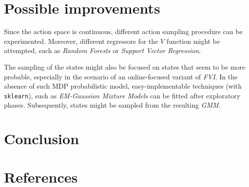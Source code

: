 \documentclass[a4paper, 12pt]{article}
\begin{document}
\section*{Possible improvements}

Since the action space is continuous, different action sampling procedure
can be experimented. Moreover, different regressors for the 
$V$ function might be attempted,
such as \emph{Random Forests} or \emph{Support Vector Regression}.

The sampling of the states might also be focused on states that 
seem to be more probable, especially in the scenario of 
an online-focused variant
of \emph{FVI}. In the absence of such MDP probabilistic model,
easy-implementable techniques (with \texttt{sklearn}), such as
\emph{EM-Gaussian Mixture Models} can be fitted
after exploratory phases. Subsequently,
states might be sampled from the resulting \emph{GMM}.

\section*{Conclusion}

\section*{References}


\end{document}
